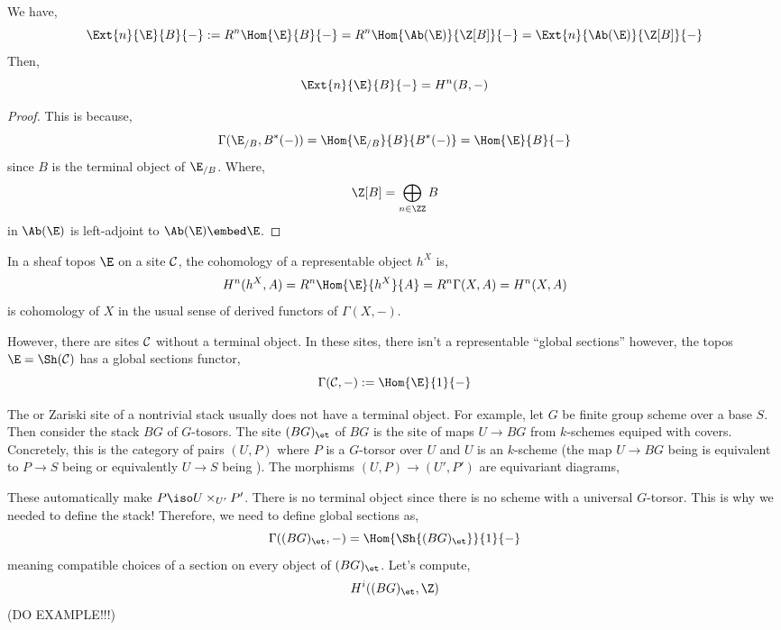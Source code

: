 \documentclass[12pt]{article}
\begin{document}
\begin{prop}
We have,
\[ \Ext{n}{\E}{B}{-} := R^n \Hom{\E}{B}{-} = R^n \Hom{\Ab(\E)}{\Z[B]}{-} = \Ext{n}{\Ab(\E)}{\Z[B]}{-} \]
Then,
\[ \Ext{n}{\E}{B}{-} = H^n(B, -) \]
\end{prop}

\begin{proof}
This is because,
\[ \Gamma(\E_{/B}, B^*(-)) = \Hom{\E_{/B}}{B}{B^*(-)} = \Hom{\E}{B}{-} \]
since $B$ is the terminal object of $\E_{/B}$. Where,
\[ \Z[B] = \bigoplus_{n \in \ZZ} B \]
in $\Ab(\E)$ is left-adjoint to $\Ab(\E) \embed \E$.
\end{proof}

\begin{example}
In a sheaf topos $\E$ on a site $\mathcal{C}$, the cohomology of a representable object $h^X$ is,
\[ H^n(h^X, A) = R^n \Hom{\E}{h^X}{A} = R^n \Gamma(X, A) = H^n(X, A) \]
is cohomology of $X$ in the usual sense of derived functors of $\Gamma(X, -)$. 
\end{example}

\begin{rmk}
However, there are sites $\mathcal{C}$ without a terminal object. In these sites, there isn't a representable ``global sections'' however, the topos $\E = \Sh(\C)$ has a global sections functor,
\[ \Gamma(\C, -) := \Hom{\E}{1}{-} \]
\end{rmk}

\begin{example}
The \etale or Zariski site of a nontrivial stack usually does not have a terminal object. For example, let $G$ be finite \etale group scheme over a base $S$. Then consider the stack $BG$ of $G$-tosors. The \etale site $(BG)_{\et}$ of $BG$ is the site of \etale maps $U \to BG$ from $k$-schemes equiped with \etale covers. Concretely, this is the category of pairs $(U, P)$ where $P$ is a $G$-torsor over $U$ and $U$ is an \etale $k$-scheme (the map $U \to BG$ being \etale is equivalent to $P \to S$ being \etale or equivalently $U \to S$ being \etale). The morphisms $(U, P) \to (U', P')$ are equivariant diagrams,
\begin{center}
\end{center}
These automatically make $P \iso U \times_{U'} P'$. There is no terminal object since there is no scheme with a universal $G$-torsor. This is why we needed to define the stack! Therefore, we need to define global sections as,
\[ \Gamma((BG)_{\et}, -) = \Hom{\Sh{(BG)_{\et}}}{1}{-} \]
meaning compatible choices of a section on every object of $(BG)_{\et}$. Let's compute,
\[ H^i((BG)_{\et}, \Z) \] 
(DO EXAMPLE!!!)
\end{example}
\end{document}
